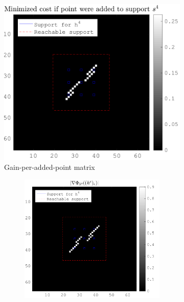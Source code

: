 \begin{figure}[!ht]\centering
\begin{subfigure}[b]{0.49\textwidth}\centering
\includegraphics[width=\textwidth]{figures/xp_grad_iterations/xp_128x128_sc2_angl1_K3_S3_node4_objmatrix_bestvalues.png}
\caption{Gain-per-added-point matrix}
\end{subfigure}
\begin{subfigure}[b]{0.49\textwidth}\centering
	\begin{subfigure}[b]{0.49\textwidth}\centering
	\includegraphics[width=\textwidth]{figures/xp_grad_iterations/xp_128x128_sc2_angl1_K3_S3_node4_1thiteration_partgrad4_bestvalues.png}

\end{subfigure}
\end{subfigure}
\end{figure}

